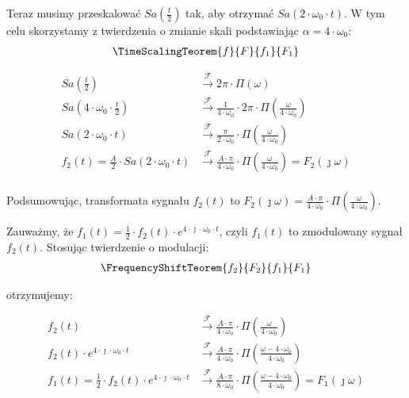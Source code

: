 \begin{task}
Teraz musimy przeskalować $Sa\left(\frac{t}{2}\right)$ tak, aby otrzymać $Sa\left(2 \cdot \omega_0 \cdot t\right)$. W tym celu skorzystamy z twierdzenia o zmianie skali podstawiając $\alpha=4 \cdot \omega_0$:
\begin{align*}
\TimeScalingTeorem{f}{F}{f_1}{F_1}
\end{align*}

\begin{align*}
Sa\left(\frac{t}{2}\right) &\xrightarrow{\mathcal F} 2\pi \cdot \Pi(\omega)\\
Sa\left(4 \cdot \omega_0 \cdot \frac{t}{2}\right) &\xrightarrow{\mathcal F} \frac{1}{4 \cdot \omega_0} \cdot 2\pi \cdot \Pi \left(\frac{\omega}{4 \cdot \omega_0}\right)\\
Sa\left(2 \cdot \omega_0 \cdot t\right) &\xrightarrow{\mathcal F} \frac{\pi}{2 \cdot \omega_0} \cdot \Pi \left(\frac{\omega}{4 \cdot \omega_0}\right)\\
f_2(t) = \frac{A}{2} \cdot Sa\left(2 \cdot \omega_0 \cdot t\right) &\xrightarrow{\mathcal F} \frac{A \cdot \pi}{4 \cdot \omega_0} \cdot \Pi \left(\frac{\omega}{4 \cdot \omega_0}\right) = F_2(\jmath \omega)\\
\end{align*}

Podsumowując, transformata sygnału $f_2(t)$ to $F_2(\jmath \omega)= \frac{A \cdot \pi}{4 \cdot \omega_0} \cdot \Pi \left(\frac{\omega}{4 \cdot \omega_0}\right)$.

Zauważmy, że $f_1(t)=\frac{1}{2} \cdot f_2(t) \cdot e^{4 \cdot \jmath \cdot \omega_0 \cdot t}$, czyli $f_1(t)$ to zmodulowany sygnał $f_2(t)$. Stosując twierdzenie o modulacji:
\begin{align*}
\FrequencyShiftTeorem{f_2}{F_2}{f_1}{F_1}
\end{align*}

otrzymujemy:

\begin{align*}
f_2(t) &\xrightarrow{\mathcal F} \frac{A \cdot \pi}{4 \cdot \omega_0} \cdot \Pi \left(\frac{\omega}{4 \cdot \omega_0}\right)\\
f_2(t) \cdot e^{4 \cdot \jmath \cdot \omega_0 \cdot t} &\xrightarrow{\mathcal F} \frac{A \cdot \pi}{4 \cdot \omega_0} \cdot \Pi \left(\frac{\omega - 4 \cdot \omega_0}{4 \cdot \omega_0}\right)\\
f_1(t) = \frac{1}{2} \cdot f_2(t) \cdot e^{4 \cdot \jmath \cdot \omega_0 \cdot t} &\xrightarrow{\mathcal F} \frac{A \cdot \pi}{8 \cdot \omega_0} \cdot \Pi \left(\frac{\omega - 4 \cdot \omega_0}{4 \cdot \omega_0}\right) = F_1(\jmath \omega)\\
\end{align*}


\end{task}
